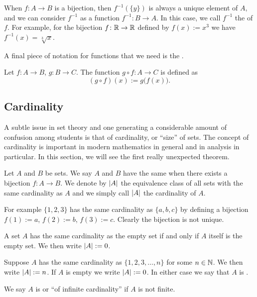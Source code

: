 When $f \colon A \to B$ is a bijection, then $f^{-1}(\{y\})$ is always
a unique element of $A$, and we can consider $f^{-1}$ as a function
$f^{-1} \colon B \to A$.
In this case, we call $f^{-1}$ the \emph{} of $f$.
For example, for the bijection $f \colon {\mathbb{R}} \to {\mathbb{R}}$ defined by $f(x) := x^3$ we have
$f^{-1}(x) = \sqrt[3]{x}$.

A final piece of notation for functions that
we need is the \emph{}.

\begin{defn}
Let $f \colon A \to B$, $g \colon B \to C$.  The function 
$g \circ f \colon A \to C$ is defined as
\begin{equation*}
(g \circ f)(x) := g\bigl(f(x)\bigr) .
\end{equation*}
\end{defn}

\subsection{Cardinality}

A subtle issue in set theory and one generating a considerable amount of
confusion among students is that of cardinality, or ``size'' of sets.  The
concept of cardinality is important in modern mathematics in general and
in analysis in particular.  In this section, we will see the first really
unexpected theorem.

\begin{defn}
Let $A$ and $B$ be sets.  We say $A$ and $B$ have the same
\emph{}
when there exists a bijection $f \colon A \to B$.  We denote
by $\left\lvert {A} \right\rvert$ the equivalence class of all sets with the same cardinality as
$A$ and we simply call $\left\lvert {A} \right\rvert$ the cardinality of $A$.
\end{defn}

For example $\{ 1,2,3 \}$ has the same cardinality as $\{ a,b,c \}$ by
defining a bijection $f(1) := a$, $f(2) := b$, $f(3) := c$.  Clearly the
bijection is not unique.

A set $A$ has the same cardinality as the empty set if and only
if $A$ itself is the empty set.  We then write $\left\lvert {A} \right\rvert := 0$.

\begin{defn}
Suppose $A$ has the same cardinality as $\{ 1,2,3,\ldots,n \}$
for some $n \in {\mathbb{N}}$.
We then write $\left\lvert {A} \right\rvert := n$.  If $A$ is empty we write $\left\lvert {A} \right\rvert := 0$.
In either case we say that $A$ is
\emph{}.

We say $A$ is \emph{} or ``of infinite cardinality''
if $A$ is not finite.
\end{defn}

